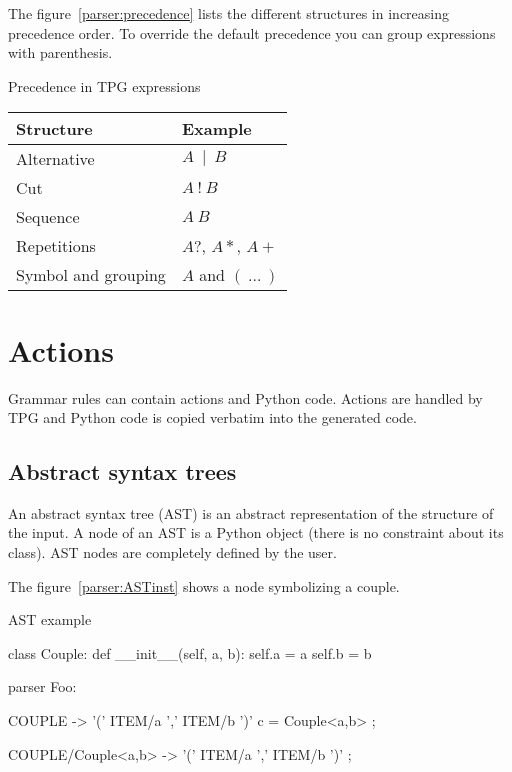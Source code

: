 The figure~\ref{parser:precedence} lists the different structures in increasing precedence order.
To override the default precedence you can group expressions with parenthesis.

\begin{tableau}
\caption{Precedence in TPG expressions}							\label{parser:precedence}
\begin{tabular}{| l | l |}
\hline
	Structure			& Example \\
\hline
\hline
	Alternative			& $A~\mid~B$ \\
\hline
	Cut					& $A~!~B$ \\
\hline
	Sequence			& $A~B$ \\
\hline
	Repetitions			& $A?$, $A*$, $A+$ \\
\hline
	Symbol and grouping	& $A$ and $(~\ldots~)$ \\
\hline
\end{tabular}
\end{tableau}

\section{Actions}

Grammar rules can contain actions and Python code.
Actions are handled by TPG and Python code is copied verbatim into the generated code.

\subsection{Abstract syntax trees}								\label{parser:AST}

An abstract syntax tree (AST) is an abstract representation of the structure of the input.
A node of an AST is a Python object (there is no constraint about its class).
AST nodes are completely defined by the user.

The figure~\ref{parser:ASTinst} shows a node symbolizing a couple.

\begin{code}
\caption{AST example}											\label{parser:ASTinst}
\begin{verbatimtab}[4]
{{
	class Couple:
		def __init__(self, a, b):
			self.a = a
			self.b = b
}}

parser Foo:

	COUPLE -> '(' ITEM/a ',' ITEM/b ')' c = Couple<a,b> ;

	COUPLE/Couple<a,b> -> '(' ITEM/a ',' ITEM/b ')' ;
\end{verbatimtab}
\end{code}

